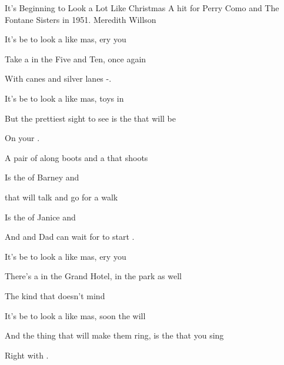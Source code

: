 \begin {SBSong}{It's Beginning to Look a Lot Like Christmas}
  {A hit for Perry Como and The Fontane Sisters in 1951.}
  {Meredith Willson}
  \begin{SBVerse}
    It's be to look a  like mas, ery you 

    Take a  in the Five and Ten,  once again

    With  canes and silver lanes  -.

    It's be to look a  like mas, toys in  

    But the prettiest sight to see is the  that will be

    On your   .
  \end{SBVerse}
  \begin{SBVerse}
    A pair of along boots and a  that shoots

    Is the  of Barney and 

     that will talk and go for a walk

    Is the  of Janice and 

    And  and Dad can  wait for  to start .
  \end{SBVerse}
  \begin{SBVerse}
    It's be to look a  like mas, ery you 

    There's a  in the Grand Hotel,  in the park as well

    The  kind that doesn't mind  

    It's be to look a  like mas, soon the  will 

    And the thing that will make them ring, is the  that you sing

    Right with  .
  \end{SBVerse}
\end{SBSong}
 
